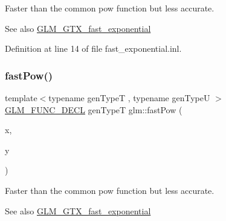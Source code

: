 Faster than the common pow function but less accurate. \begin{DoxySeeAlso}{See also}
\hyperlink{group__gtx__fast__exponential}{G\+L\+M\+\_\+\+G\+T\+X\+\_\+fast\+\_\+exponential} 
\end{DoxySeeAlso}


Definition at line 14 of file fast\+\_\+exponential.\+inl.

\mbox{\label{group__gtx__fast__exponential_ga08af6240d87ce7b9851c9095808c1eb8}} 
\subsubsection{\texorpdfstring{fast\+Pow()}{fastPow()}\hspace{0.1cm}{\footnotesize\ttfamily [2/2]}}
{\footnotesize\ttfamily template$<$typename gen\+TypeT , typename gen\+TypeU $>$ \\
\hyperlink{setup_8hpp_ab2d052de21a70539923e9bcbf6e83a51}{G\+L\+M\+\_\+\+F\+U\+N\+C\+\_\+\+D\+E\+CL} gen\+TypeT glm\+::fast\+Pow (\begin{DoxyParamCaption}\item[{gen\+TypeT const \&}]{x,  }\item[{gen\+TypeU const \&}]{y }\end{DoxyParamCaption})}

Faster than the common pow function but less accurate. \begin{DoxySeeAlso}{See also}
\hyperlink{group__gtx__fast__exponential}{G\+L\+M\+\_\+\+G\+T\+X\+\_\+fast\+\_\+exponential} 
\end{DoxySeeAlso}
